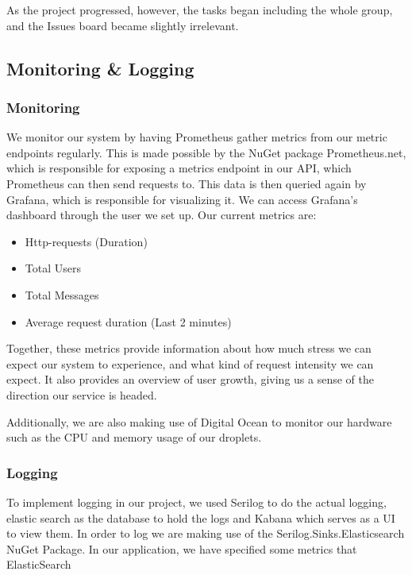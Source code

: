 \noindent As the project progressed, however, the tasks began including the whole group, and the Issues board became slightly irrelevant.

\subsection{Monitoring \& Logging}

\subsubsection{Monitoring} \label{Monitoring}

We monitor our system by having Prometheus gather metrics from our metric endpoints regularly. This is made possible by the NuGet package Prometheus.net, which is responsible for exposing a metrics endpoint in our API, which Prometheus can then send requests to. This data is then queried again by Grafana, which is responsible for visualizing it. We can access Grafana's dashboard through the user we set up. Our current metrics are:

\begin{itemize}
    \item Http-requests (Duration)
    \item Total Users
    \item Total Messages
    \item Average request duration (Last 2 minutes)
\end{itemize}

\noindent Together, these metrics provide information about how much stress we can expect our system to experience, and what kind of request intensity we can expect. It also provides an overview of user growth, giving us a sense of the direction our service is headed. 

Additionally, we are also making use of Digital Ocean to monitor our hardware such as the CPU and memory usage of our droplets.

\subsubsection{Logging} \label{Logging}

To implement logging in our project, we used Serilog to do the actual logging, elastic search as the database to hold the logs and Kabana which serves as a UI to view them.
In order to log we are making use of the Serilog.Sinks.Elasticsearch NuGet Package. In our application, we have specified some metrics that ElasticSearch 

